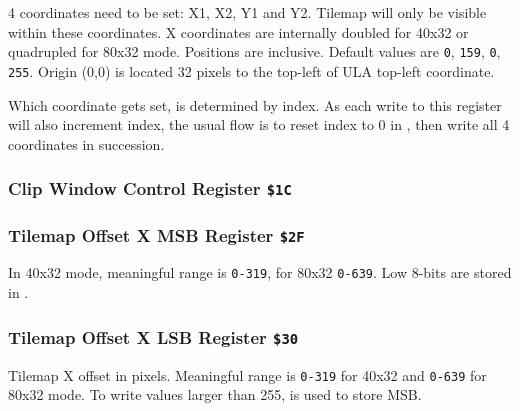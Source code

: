 \documentclass[12pt,twoside,openright,a4paper]{book}
\begin{document}
\begin{NextPort}
\end{NextPort}

4 coordinates need to be set: X1, X2, Y1 and Y2. Tilemap will only be visible within these coordinates. X coordinates are internally doubled for 40x32 or quadrupled for 80x32 mode. Positions are inclusive. Default values are {\tt 0}, {\tt 159}, {\tt 0}, {\tt 255}. Origin (0,0) is located 32 pixels to the top-left of ULA top-left coordinate.

Which coordinate gets set, is determined by index. As each write to this register will also increment index, the usual flow is to reset index to 0 in , then write all 4 coordinates in succession.


\pagebreak
\subsubsection{Clip Window Control Register {\tt \$1C}}



\subsubsection{Tilemap Offset X MSB Register {\tt \$2F}}

\begin{NextPort}
\end{NextPort}

In 40x32 mode, meaningful range is {\tt 0-319}, for 80x32 {\tt 0-639}. Low 8-bits are stored in .


\subsubsection{Tilemap Offset X LSB Register {\tt \$30}}

\begin{NextPort}
\end{NextPort}

Tilemap X offset in pixels. Meaningful range is {\tt 0-319} for 40x32 and {\tt 0-639} for 80x32 mode. To write values larger than 255,  is used to store MSB.
\end{document}
